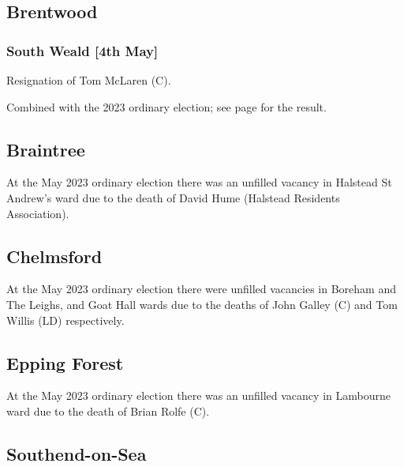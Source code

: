 \documentclass[a4paper,openany]{book}
\begin{document}
\begin{resultsiii}
\subsection*{Brentwood}

\subsubsection*{South Weald \hspace*{\fill}\nolinebreak[1]%
	\enspace\hspace*{\fill}
	[4th May]}


Resignation of Tom McLaren (C).

Combined with the 2023 ordinary election; see page \pageref{SouthWealdBrentwood} for the result.

\subsection*{Braintree}

At the May 2023 ordinary election there was an unfilled vacancy in Halstead St Andrew's ward due to the death of David Hume (Halstead Residents Association).%

\subsection*{Chelmsford}

At the May 2023 ordinary election there were unfilled vacancies in Boreham and The Leighs, and Goat Hall wards due to the deaths of John Galley (C) and Tom Willis (LD) respectively.%
%

\subsection*{Epping Forest}

At the May 2023 ordinary election there was an unfilled vacancy in Lambourne ward due to the death of Brian Rolfe (C).%

\subsection*{Southend-on-Sea}


\end{resultsiii}
\end{document}
